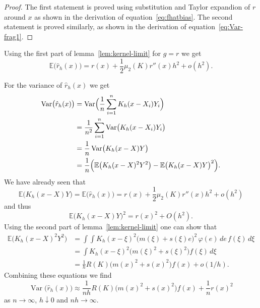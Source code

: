 \documentclass[
  a4paper,
]{article}
\theoremstyle{definition}
\theoremstyle{definition}
\theoremstyle{definition}
\theoremstyle{definition}
\theoremstyle{remark}
\begin{document}
\begin{proof}
The first statement is proved using substitution and Taylor expandion of \(r\)
around \(x\) as shown in the derivation of equation~\eqref{eq:fhatbias}.
The second statement is proved similarly, as shown in the derivation of
equation~\eqref{eq:Var-frag1}.
\end{proof}

Using the first part of lemma~\ref{lem:kernel-limit} for \(g = r\) we get
\begin{equation*}
  \mathbb{E}\bigl( \hat r_h(x) \bigr)
  = r(x) + \frac12 \mu_2(K) r''(x) h^2 + o(h^2).
\end{equation*}

For the variance of \(\hat r_h(x)\) we get
\begin{align*}
  \mathop{\mathrm{Var}}\bigl( \hat r_h(x) \bigr)
  &= \mathop{\mathrm{Var}}\Bigl( \frac1n \sum_{i=1}^n K_h(x - X_i) Y_i \Bigr) \\
  &= \frac{1}{n^2} \sum_{i=1}^n \mathop{\mathrm{Var}}\bigl( K_h(x - X_i) Y_i \bigr) \\
  &= \frac1n \mathop{\mathrm{Var}}\bigl( K_h(x - X) Y \bigr) \\
  &= \frac1n \Bigl( \mathbb{E}\bigl( K_h(x - X)^2 Y^2 \bigr) - \mathbb{E}\bigl( K_h(x - X) Y \bigr)^2 \Bigr).
\end{align*}
We have already seen that
\begin{equation*}
  \mathbb{E}\bigl( K_h(x - X) Y \bigr)
  = \mathbb{E}\bigl( \hat r_h(x) \bigr)
  = r(x) + \frac12 \mu_2(K) r''(x) h^2 + o(h^2)
\end{equation*}
and thus
\begin{equation*}
  \mathbb{E}\bigl( K_h(x - X) Y \bigr)^2
  = r(x)^2 + O(h^2).
\end{equation*}
Using the second part of lemma~\ref{lem:kernel-limit} one can show that
\begin{align*}
  \mathbb{E}\bigl( K_h(x - X)^2 Y^2 \bigr)
  &= \int \int K_h(x - \xi)^2 \bigl( m(\xi) + s(\xi)e \bigr)^2 \,\varphi(e)\,de \,f(\xi)\,d\xi \\
  &= \int K_h(x - \xi)^2 \bigl( m(\xi)^2 + s(\xi)^2 \bigr) f(\xi) \,d\xi \\
  &= \frac1h R(K) \bigl( m(x)^2 + s(x)^2 \bigr) f(x) + o(1/h).
\end{align*}
Combining these equations we find
\begin{equation*}
  \mathop{\mathrm{Var}}\bigl( \hat r_h(x) \bigr)
  \approx \frac{1}{nh} R(K) \bigl( m(x)^2 + s(x)^2 \bigr) f(x)
    + \frac1n r(x)^2
\end{equation*}
as \(n\to\infty\), \(h\downarrow 0\) and \(nh\to\infty\).
\end{document}
